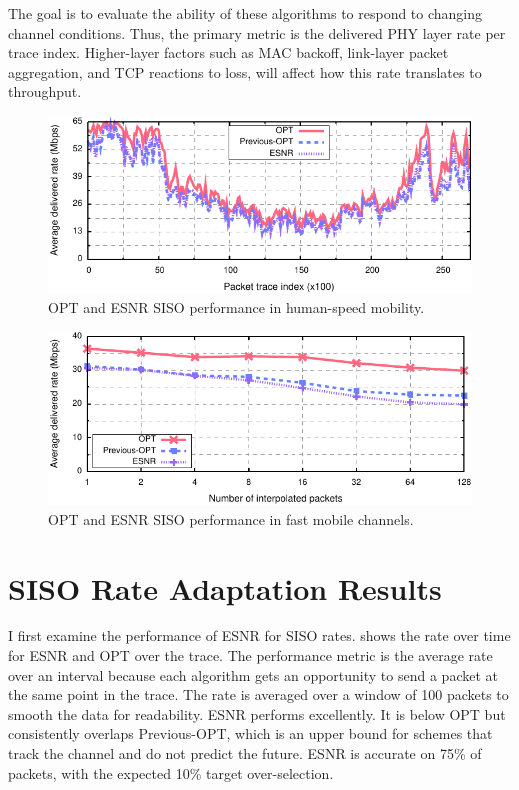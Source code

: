 The goal is to evaluate the ability of these algorithms to respond to changing channel conditions. Thus, the primary metric is the delivered PHY layer rate per trace index. Higher-layer factors such as MAC backoff, link-layer packet aggregation, and TCP reactions to loss, will affect how this rate translates to throughput.

\begin{figure}[t]
      \centering
      \includegraphics[width=\textwidth]{figures/rate/siso_rate_time_opt_eff.pdf}
      \caption{\label{fig:siso_rate_time_opt_eff} OPT and ESNR SISO performance in human-speed mobility.}
\end{figure}

\begin{figure}[t]
      \centering
      \includegraphics[width=\textwidth]{figures/rate/siso_rate_skip_opt_eff.pdf}
      \caption{\label{fig:siso_rate_skip_opt_eff} OPT and ESNR SISO performance in fast mobile channels.}
\end{figure}



\section{SISO Rate Adaptation Results}
I first examine the performance of ESNR for SISO rates.  shows the rate over time for ESNR and OPT over the trace. The performance metric is the average rate over an interval because each algorithm gets an opportunity to send a packet at the same point in the trace. The rate is averaged over a window of 100 packets to smooth the data for readability. ESNR performs excellently. It is below OPT but consistently overlaps Previous-OPT, which is an upper bound for schemes that track the channel and do not predict the future. ESNR is accurate on 75\% of packets, with the expected 10\% target over-selection.

